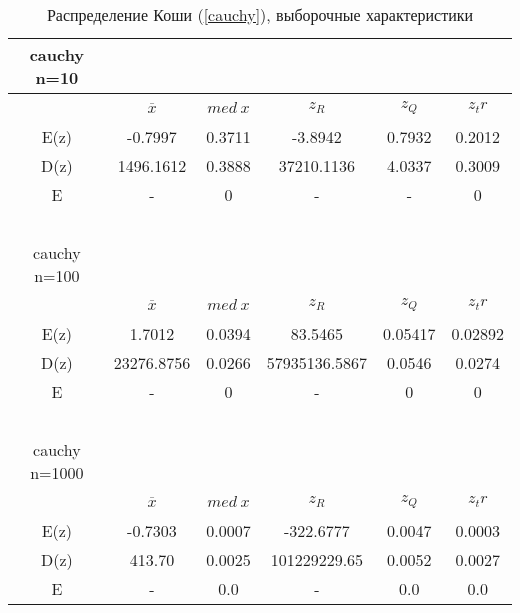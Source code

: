 \documentclass[12pt,a4paper]{article}
\begin{document}
			\begin{table}[htp]
				\label{tabular:cauchy}
				\begin{center}
					\begin{tabular}{|c|c|c|c|c|c|} 
						
						\hline
						cauchy n=10 & \ & \ & \ & \ & \ \\ \hline
						\ & $\overline{x}$ & $med \ x$ & $z_R$ & $z_Q$ & $z_tr$ \\ \hline
						E(z) & -0.7997 & 0.3711 & -3.8942 & 0.7932 & 0.2012 \\ \hline
						D(z) & 1496.1612  & 0.3888 & 37210.1136 &  4.0337  &  0.3009 \\ \hline
						E & - & 0 & - & - & 0\\\hline
						\ & \ & \ & \ & \ & \ \\ \hline
						
						cauchy n=100 & \ & \ & \ & \ & \ \\ \hline
						\ & $\overline{x}$ & $med \ x$  & $z_R$  & $z_Q$  & $z_tr$ \\ \hline
						E(z) & 1.7012 & 0.0394 &  83.5465 & 0.05417 & 0.02892 \\ \hline
						D(z) & 23276.8756   & 0.0266 & 57935136.5867 &  0.0546   &  0.0274 \\ \hline
						E & - & 0 & - & 0 & 0\\\hline
						\ & \ & \ & \ & \ & \ \\ \hline
						
						cauchy n=1000 & \ & \ & \ & \ & \ \\ \hline
						\ & $\overline{x}$ & $med \ x$  & $z_R$  & $z_Q$  & $z_tr$ \\ \hline
						E(z) & -0.7303 & 0.0007 &  -322.6777 & 0.0047 & 0.0003 \\ \hline
						D(z) & 413.70   & 0.0025 & 101229229.65 &  0.0052   &  0.0027 \\ \hline
						E & - & 0.0 & - & 0.0 & 0.0\\\hline
						
					\end{tabular}
				\end{center}
				\caption{Распределение Коши (\ref{cauchy}), выборочные характеристики}
			\end{table}
			
\end{document}
